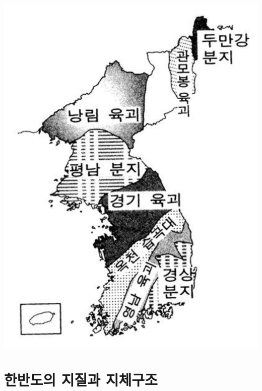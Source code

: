 \documentclass[12pt,a4paper]{book}
\newcommand{\SectionMargin}			{\newpage  \null \vskip 0cm}
\begin{document}
		\clearpage
		\includegraphics[scale=0.9,  width=1.0\textwidth]{./fig/fig_001.pdf}

		\clearpage
			

		\clearpage
			


	\SectionMargin
	\section{한반도의 지질과 지체구조}
	\null
\end{document}
